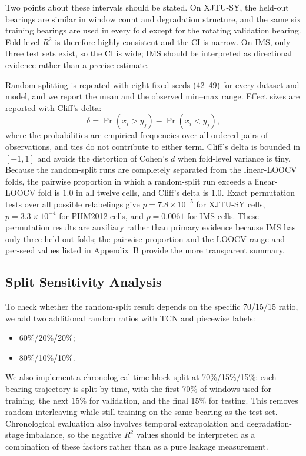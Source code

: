 \documentclass[pdflatex,sn-mathphys-num]{sn-jnl}
\begin{document}
Two points about these intervals should be stated. On XJTU-SY, the held-out bearings are similar in window count and degradation structure, and the same six training bearings are used in every fold except for the rotating validation bearing. Fold-level $R^2$ is therefore highly consistent and the CI is narrow. On IMS, only three test sets exist, so the CI is wide; IMS should be interpreted as directional evidence rather than a precise estimate.

Random splitting is repeated with eight fixed seeds (42--49) for every dataset and model, and we report the mean and the observed min--max range. Effect sizes are reported with Cliff's delta:
\begin{equation}
\delta = \Pr(x_i > y_j) - \Pr(x_i < y_j),
\label{eq:cliff}
\end{equation}
where the probabilities are empirical frequencies over all ordered pairs of observations, and ties do not contribute to either term. Cliff's delta is bounded in $[-1, 1]$ and avoids the distortion of Cohen's $d$ when fold-level variance is tiny. Because the random-split runs are completely separated from the linear-LOOCV folds, the pairwise proportion in which a random-split run exceeds a linear-LOOCV fold is $1.0$ in all twelve cells, and Cliff's delta is $1.0$. Exact permutation tests over all possible relabelings give $p=7.8\times10^{-5}$ for XJTU-SY cells, $p=3.3\times10^{-4}$ for PHM2012 cells, and $p=0.0061$ for IMS cells. These permutation results are auxiliary rather than primary evidence because IMS has only three held-out folds; the pairwise proportion and the LOOCV range and per-seed values listed in Appendix~B provide the more transparent summary.

\subsection{Split Sensitivity Analysis}
To check whether the random-split result depends on the specific 70/15/15 ratio, we add two additional random ratios with TCN and piecewise labels:
\begin{itemize}
    \item 60\%/20\%/20\%;
    \item 80\%/10\%/10\%.
\end{itemize}
We also implement a chronological time-block split at 70\%/15\%/15\%: each bearing trajectory is split by time, with the first 70\% of windows used for training, the next 15\% for validation, and the final 15\% for testing. This removes random interleaving while still training on the same bearing as the test set. Chronological evaluation also involves temporal extrapolation and degradation-stage imbalance, so the negative $R^2$ values should be interpreted as a combination of these factors rather than as a pure leakage measurement.
\end{document}
